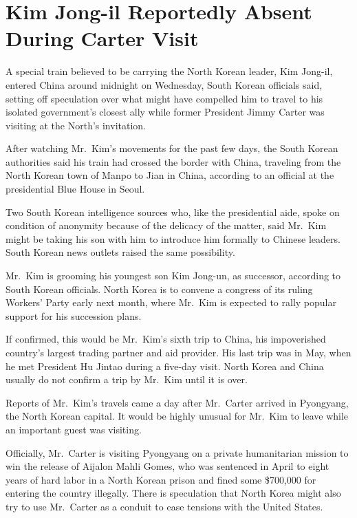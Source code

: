 ﻿\documentclass[12pt]{article}
\begin{document}
\pagebreak
\section{Kim Jong-il Reportedly Absent During Carter Visit}

\lettrine{A}{} special train believed to be carrying the North Korean
leader, Kim Jong-il, entered China around midnight on Wednesday, South Korean officials said,
setting off speculation over what might have compelled him to travel to his isolated government's
closest ally while former President Jimmy Carter was visiting at the North's invitation.

After watching Mr.~Kim's movements for the past few days, the South Korean authorities said his
train had crossed the border with China, traveling from the North Korean town of Manpo to Jian in
China, according to an official at the presidential Blue House in Seoul.

Two South Korean intelligence sources who, like the presidential aide, spoke on condition of
anonymity because of the delicacy of the matter, said Mr.~Kim might be taking his son with him to
introduce him formally to Chinese leaders. South Korean news outlets raised the same possibility.

Mr.~Kim is grooming his youngest son Kim Jong-un, as successor, according to South Korean officials.
North Korea is to convene a congress of its ruling Workers' Party early next month, where Mr.~Kim is
expected to rally popular support for his succession plans.

If confirmed, this would be Mr.~Kim's sixth trip to China, his impoverished country's largest
trading partner and aid provider. His last trip was in May, when he met President Hu Jintao during a
five-day visit. North Korea and China usually do not confirm a trip by Mr.~Kim until it is over.

Reports of Mr.~Kim's travels came a day after Mr.~Carter arrived in Pyongyang, the North Korean
capital. It would be highly unusual for Mr.~Kim to leave while an important guest was visiting.

Officially, Mr.~Carter is visiting Pyongyang on a private humanitarian mission to win the release of
Aijalon Mahli Gomes, who was sentenced in April to eight years of hard labor in a North Korean
prison and fined some \$700,000 for entering the country illegally. There is speculation that North
Korea might also try to use Mr.~Carter as a conduit to ease tensions with the United States.
\end{document}
